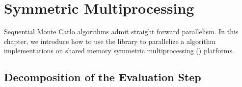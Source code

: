 %
%
%
%

\chapter{Symmetric Multiprocessing}
\label{chap:Symmetric Multiprocessing}

Sequential Monte Carlo algorithms admit straight forward parallelism. In this
chapter, we introduce how to use the library to parallelize a \smc algorithm
implementations on shared memory symmetric multiprocessing (\smp) platforms.

\section{Decomposition of the Evaluation Step}
\label{sec:Decomposition of the Evaluation Step}


